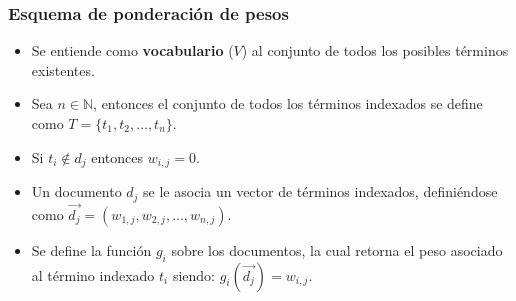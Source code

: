 \documentclass[
10pt, %
aspectratio=169, %
]{beamer}
\begin{document}
	\begin{frame}
		
		\frametitle{Esquema de ponderación de pesos}
		
		\begin{itemize}
			\item Se entiende como \textbf{vocabulario} ($V$) al conjunto de todos los posibles términos existentes. \\[2mm]
			
			\item Sea $n \in \mathbb{N}$, entonces el conjunto de todos los términos indexados se define como $T = \{t_1, t_2, \dotsc, t_n\}$. \\[2mm]
			
			\item Si $t_i \notin d_j$ entonces $w_{i, j} = 0$. \\[2mm]
			
			\item Un documento $d_j$ se le asocia un vector de términos indexados, definiéndose como $\overrightarrow{d_j} = (w_{1, j}, w_{2, j}, \dotsc, w_{n, j})$. \\[2mm]
		
			\item Se define la función $g_i$ sobre los documentos, la cual retorna el peso asociado al término indexado $t_i$ siendo: $g_i(\overrightarrow{d_j}) = w_{i, j}$.
				
		\end{itemize}
	\end{frame}
	
\end{document}
